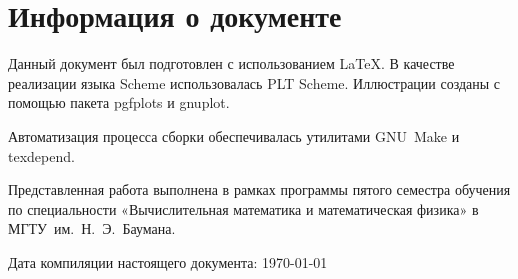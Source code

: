 \documentclass{article}
\newcommand{\program}[1]{{\sf #1}}
\theoremstyle{ruthm}
\numberwithin{thm}{section}
\theoremstyle{rurem}
\theoremstyle{rudfn}
\numberwithin{equation}{section}
\begin{document}
\section{Информация о документе}

Данный документ был подготовлен с использованием \LaTeX{}. В качестве
реализации языка Scheme использовалась \program{PLT Scheme}.
Иллюстрации созданы с помощью пакета \program{pgfplots} и
\program{gnuplot}.

Автоматизация процесса сборки обеспечивалась утилитами
\program{GNU Make} и \program{texdepend}.

Представленная работа выполнена в рамках программы пятого семестра
обучения по специальности «Вычислительная математика и математическая
физика» в МГТУ им. Н. Э. Баумана.

Дата компиляции настоящего документа: \today



\end{document}
